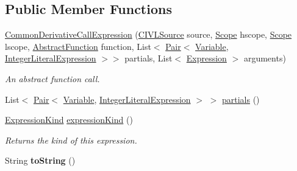 \subsection*{Public Member Functions}
\begin{DoxyCompactItemize}
\item 
\hyperlink{classedu_1_1udel_1_1cis_1_1vsl_1_1civl_1_1model_1_1common_1_1expression_1_1CommonDerivativeCallExpression_a258df204d8a05e5cb594411c3697b4c8}{Common\+Derivative\+Call\+Expression} (\hyperlink{interfaceedu_1_1udel_1_1cis_1_1vsl_1_1civl_1_1model_1_1IF_1_1CIVLSource}{C\+I\+V\+L\+Source} source, \hyperlink{interfaceedu_1_1udel_1_1cis_1_1vsl_1_1civl_1_1model_1_1IF_1_1Scope}{Scope} hscope, \hyperlink{interfaceedu_1_1udel_1_1cis_1_1vsl_1_1civl_1_1model_1_1IF_1_1Scope}{Scope} lscope, \hyperlink{interfaceedu_1_1udel_1_1cis_1_1vsl_1_1civl_1_1model_1_1IF_1_1AbstractFunction}{Abstract\+Function} function, List$<$ \hyperlink{classedu_1_1udel_1_1cis_1_1vsl_1_1civl_1_1util_1_1IF_1_1Pair}{Pair}$<$ \hyperlink{interfaceedu_1_1udel_1_1cis_1_1vsl_1_1civl_1_1model_1_1IF_1_1variable_1_1Variable}{Variable}, \hyperlink{interfaceedu_1_1udel_1_1cis_1_1vsl_1_1civl_1_1model_1_1IF_1_1expression_1_1IntegerLiteralExpression}{Integer\+Literal\+Expression} $>$$>$ partials, List$<$ \hyperlink{interfaceedu_1_1udel_1_1cis_1_1vsl_1_1civl_1_1model_1_1IF_1_1expression_1_1Expression}{Expression} $>$ arguments)
\begin{DoxyCompactList}\small\item\em An abstract function call. \end{DoxyCompactList}\item 
List$<$ \hyperlink{classedu_1_1udel_1_1cis_1_1vsl_1_1civl_1_1util_1_1IF_1_1Pair}{Pair}$<$ \hyperlink{interfaceedu_1_1udel_1_1cis_1_1vsl_1_1civl_1_1model_1_1IF_1_1variable_1_1Variable}{Variable}, \hyperlink{interfaceedu_1_1udel_1_1cis_1_1vsl_1_1civl_1_1model_1_1IF_1_1expression_1_1IntegerLiteralExpression}{Integer\+Literal\+Expression} $>$ $>$ \hyperlink{classedu_1_1udel_1_1cis_1_1vsl_1_1civl_1_1model_1_1common_1_1expression_1_1CommonDerivativeCallExpression_aea602cc0619362e205b3f0025e63bfb2}{partials} ()
\item 
\hyperlink{enumedu_1_1udel_1_1cis_1_1vsl_1_1civl_1_1model_1_1IF_1_1expression_1_1Expression_1_1ExpressionKind}{Expression\+Kind} \hyperlink{classedu_1_1udel_1_1cis_1_1vsl_1_1civl_1_1model_1_1common_1_1expression_1_1CommonDerivativeCallExpression_a3d616c6391a34f4556a5080eca6e9882}{expression\+Kind} ()
\begin{DoxyCompactList}\small\item\em Returns the kind of this expression. \end{DoxyCompactList}\item 
\hypertarget{classedu_1_1udel_1_1cis_1_1vsl_1_1civl_1_1model_1_1common_1_1expression_1_1CommonDerivativeCallExpression_a44f234e17d4973c9d7c43734583c041d}{}String {\bfseries to\+String} ()\label{classedu_1_1udel_1_1cis_1_1vsl_1_1civl_1_1model_1_1common_1_1expression_1_1CommonDerivativeCallExpression_a44f234e17d4973c9d7c43734583c041d}

\end{DoxyCompactItemize}
